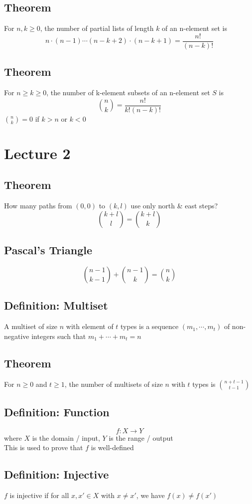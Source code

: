 \documentclass[11pt]{article}
\begin{document}
\subsection{Theorem}
For $n,k\geq0$, the number of partial lists of length $k$ of an n-element set is \[n\cdot(n-1)\cdots(n-k+2)\cdot(n-k+1)=\dfrac{n!}{(n-k)!}\]
\subsection{Theorem}
For $n\geq k\geq0$, the number of k-element subsets of an n-element set $S$ is \[{n\choose k} = \dfrac{n!}{k!(n-k)!}\]
${n\choose k} = 0$ if $k>n$ or $k<0$

\section{Lecture 2}
\subsection{Theorem}
How many paths from $(0,0)$ to $(k,l)$ use only north \& east steps? 
\[{{k+l}\choose l} = {{k+l}\choose k}\]
\subsection{Pascal's Triangle}
\[{n-1\choose k-1} + {n-1\choose k} = {n\choose k}\]
\subsection{Definition: Multiset}
A multiset of size $n$ with element of $t$ types is a sequence $(m_1,\cdots,m_t)$ of non-negative integers such that $m_1+\cdots+m_t=n$
\subsection{Theorem}
For $n\geq0$ and $t\geq1$, the number of multisets of size $n$ with $t$ types is $n+t-1\choose t-1$
\subsection{Definition: Function}
\[f:X\rightarrow Y\]
where $X$ is the domain / input, $Y$ is the range / output \\
This is used to prove that $f$ is well-defined
\subsection{Definition: Injective}
$f$ is injective if for all $x,x'\in X$ with $x\neq x'$, we have $f(x)\neq f(x')$
\end{document}
